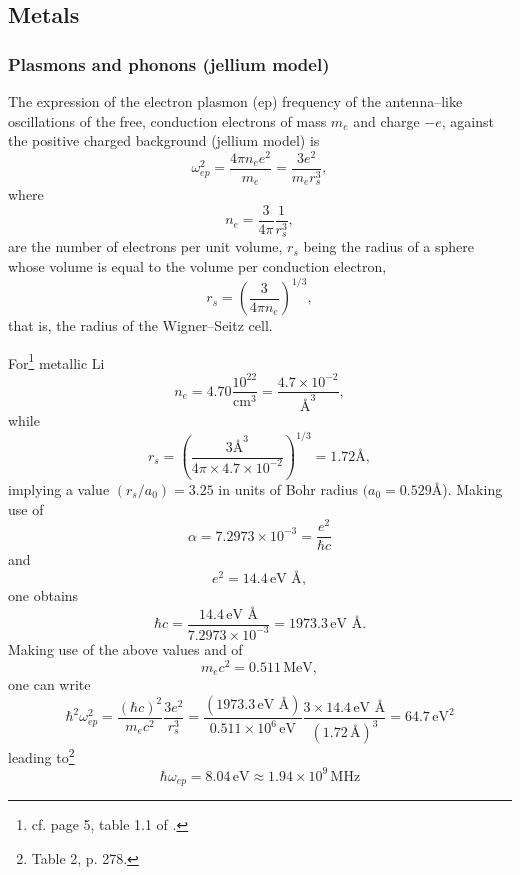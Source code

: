 \begin{subappendices}
\subsection{Metals}\label{App3A2}
\subsubsection{Plasmons and phonons (jellium model)}
The expression of the electron plasmon (ep) frequency of the antenna--like oscillations of the free, conduction electrons of mass $m_e$ and charge $-e$, against the positive charged background (jellium model) is
\begin{equation}\label{eq3.A.33}
\omega_{ep}^2=\frac{4\pi n_e e^2}{m_e}=\frac{3e^2}{m_er_s^3},
\end{equation}
where 
\begin{equation}
n_e=\frac{3}{4\pi}\frac{1}{r_s^3},
\end{equation}
are the number of electrons per unit volume, $r_s$ being the radius of a sphere whose volume is equal to the volume per conduction electron,
\begin{equation}
r_s=\left(\frac{3}{4\pi n_e}\right)^{1/3},
\end{equation}
that is, the radius of the Wigner--Seitz cell.


For\footnote{cf. page 5, table 1.1 of \cite{Ashcroft:87}.} metallic Li
\begin{equation}
n_e=4.70\frac{10^{22}}{\text{cm}^3}=\frac{4.7\times10^{-2}}{\text{\AA{}}^3},
\end{equation}
while
\begin{equation}
r_s=\left(\frac{3\text{\AA}^3}{4\pi\times4.7\times10^{-2}}\right)^{1/3}=1.72\text{\AA},
\end{equation}
implying a value $(r_s/a_0)=3.25$ in units of  Bohr radius $(a_0=0.529$\AA).
Making use of 
\begin{equation}
\alpha=7.2973\times10^{-3}=\frac{e^2}{\hbar c}
\end{equation}
and
\begin{equation}
e^2=14.4\,\text{eV \AA},
\end{equation}
one obtains
\begin{equation}
\hbar c=\frac{14.4\,\text{eV \AA}}{7.2973\times10^{-3}}=1973.3\,\text{eV \AA}.
\end{equation}
Making use of the above values and of
\begin{equation}
m_ec^2=0.511\,\text{MeV},
\end{equation}
one can write
\begin{equation}
\hbar^2\omega^2_{ep}=\frac{(\hbar c)^2}{m_e c^2}\frac{3e^2}{r_s^3}=\frac{(1973.3\,\text{eV \AA})}{0.511\times10^6\,\text{eV}}\frac{3\times14.4\,\text{eV \AA}}{(1.72\,\text{\AA})^3}=64.7\,\text{eV}^2
\end{equation}
leading to\footnote{\cite{Kittel:96} Table 2, p. 278.}
\begin{equation}
\hbar\omega_{ep}=8.04\,\text{eV}\approx 1.94\times 10^9\,\text{MHz}
\end{equation}



\end{subappendices}
